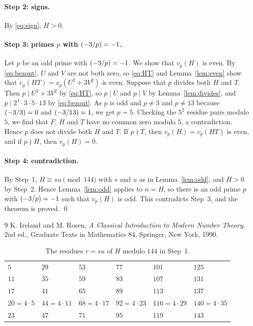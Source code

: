 \documentclass[11pt]{article}
\newcommand{\leg}[2]{\mathchoice{\biggl(\dfrac{#1}{#2}\biggr)}{(#1/#2)}{(#1/#2)}{(#1/#2)}}
\begin{document}
\paragraph{Step 2: signs.} By \eqref{eq:sign}, $H>0$.

\paragraph{\texorpdfstring{Step 3: primes $p$ with $\leg{-3}{p}=-1$.}{Step 3: inert primes.}} Let $p$ be an odd prime with $\leg{-3}{p}=-1$. We show that $v_p(H)$ is even. By \eqref{eq:bezout}, $U$ and $V$ are not both zero, so \eqref{eq:HT} and Lemma~\ref{lem:even} show that $v_p(HT)=v_p(U^2+3V^2)$ is even. Suppose that $p$ divides both $H$ and $T$. Then $p\mid U^2+3V^2$ by \eqref{eq:HT}, so $p\mid U$ and $p\mid V$ by Lemma~\ref{lem:divides}, and $p\mid 2^{4}\cdot 3\cdot 5\cdot 13$ by \eqref{eq:bezout}. As $p$ is odd and $p\neq3$ and $p\neq13$ because $\leg{-3}{3}=0$ and $\leg{-3}{13}=1$, we get $p=5$. Checking the $5^2$ residue pairs modulo $5$, we find that $F$, $H$ and $T$ have no common zero modulo $5$, a contradiction. Hence $p$ does not divide both $H$ and $T$. If $p\nmid T$, then $v_p(H)=v_p(HT)$ is even, and if $p\nmid H$, then $v_p(H)=0$.

\paragraph{Step 4: contradiction.} By Step~1, $H\equiv su\pmod{144}$ with $s$ and $u$ as in Lemma~\ref{lem:odd}, and $H>0$ by Step~2. Hence Lemma~\ref{lem:odd} applies to $n=H$, so there is an odd prime $p$ with $\leg{-3}{p}=-1$ such that $v_p(H)$ is odd. This contradicts Step~3, and the theorem is proved.
\qed

\begin{thebibliography}{9}
 K. Ireland and M. Rosen, \emph{A Classical Introduction to Modern Number Theory}, 2nd ed., Graduate Texts in Mathematics 84, Springer, New York, 1990.
\end{thebibliography}

\begin{table}[ht]
\centering\footnotesize
\caption{The residues $r=su$ of $H$ modulo $144$ in Step~1.}\label{tab:res}
\begin{tabular}{llllll}
\hline
$5$ & $29$ & $53$ & $77$ & $101$ & $125$\\
$11$ & $35$ & $59$ & $83$ & $107$ & $131$\\
$17$ & $41$ & $65$ & $89$ & $113$ & $137$\\
$20=4\cdot5$ & $44=4\cdot11$ & $68=4\cdot17$ & $92=4\cdot23$ & $116=4\cdot29$ & $140=4\cdot35$\\
$23$ & $47$ & $71$ & $95$ & $119$ & $143$\\
\hline
\end{tabular}
\end{table}
\end{document}
